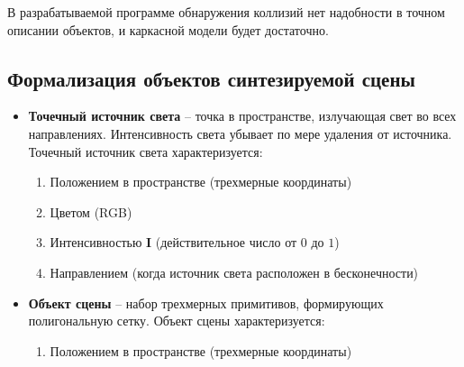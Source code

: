 В разрабатываемой программе обнаружения коллизий нет надобности в точном
описании объектов, и каркасной модели будет достаточно.

\subsection{Формализация объектов синтезируемой сцены}

\begin{itemize}
    \item \textbf{Точечный источник света} -- точка в пространстве, излучающая свет во всех направлениях. Интенсивность света убывает по мере удаления от источника. Точечный источник света характеризуется:
        \begin{enumerate}[label=(\alph*)]
            \item Положением в пространстве (трехмерные координаты)
            \item Цветом ({RGB})
            \item Интенсивностью \textbf{I} (действительное число от $0$ до $1$)
            \item Направлением (когда источник света расположен в бесконечности)
        \end{enumerate}
    \item \textbf{Объект сцены} -- набор трехмерных примитивов, формирующих полигональную сетку. Объект сцены характеризуется:
        \begin{enumerate}[label=(\alph*)]
            \item Положением в пространстве (трехмерные координаты)

\end{enumerate}
\end{itemize}
